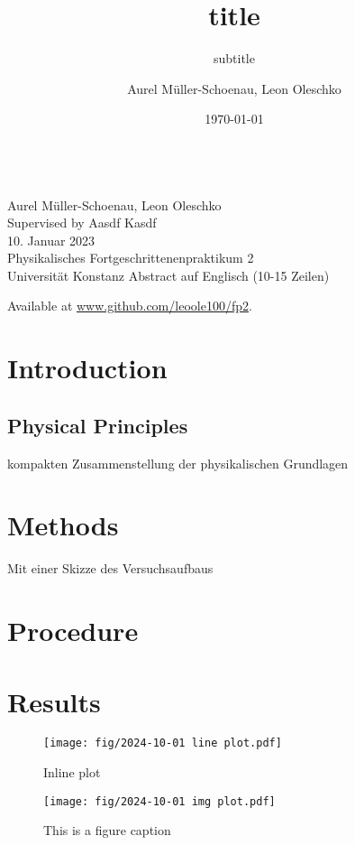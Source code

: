 \documentclass[
    parskip=half, 
    twoside=false,
    twocolumn=true
]{scrarticle}
\begin{document}
\title{title}
\subtitle{subtitle}
\author{Aurel Müller-Schoenau, Leon Oleschko}
\date{\dotdate\today}


\begin{titlepage}
    \sffamily

    \vspace*{3cm}
    {
        \fontsize{32}{32}
    }
    \vspace{.25cm}\\
    {
        \Large
        Aurel Müller-Schoenau, Leon Oleschko\\
        Supervised by Aasdf Kasdf
        \vspace{.05cm}\\
        10. Januar 2023
        \vspace{.25cm}\\
        \normalsize
        Physikalisches Fortgeschrittenenpraktikum 2\\
        Universität Konstanz
    }
    \vfill
    {
        Abstract auf Englisch (10-15 Zeilen)
        \blindtext[2]
    }
    \vfill
    \begin{flushright}
        Available at \url{www.github.com/leoole100/fp2}.
    \end{flushright}
\end{titlepage}


\section{Introduction}
\blindtext

\subsection{Physical Principles}
kompakten Zusammenstellung der physikalischen Grundlagen
\blindtext

\section{Methods}
Mit einer Skizze des Versuchsaufbaus
\blindtext[3]

\pagebreak
\section{Procedure}
\blindtext[5]

\pagebreak
\section{Results}
\begin{figure}[H]
    \centering
    \texttt{[image: fig/2024-10-01 line plot.pdf]}
    \caption{Inline plot}
\end{figure}
\begin{figure*}
    \centering \texttt{[image: fig/2024-10-01 img plot.pdf]}
    \caption{This is a figure caption}
\end{figure*}
\blindtext[3]
\end{document}
